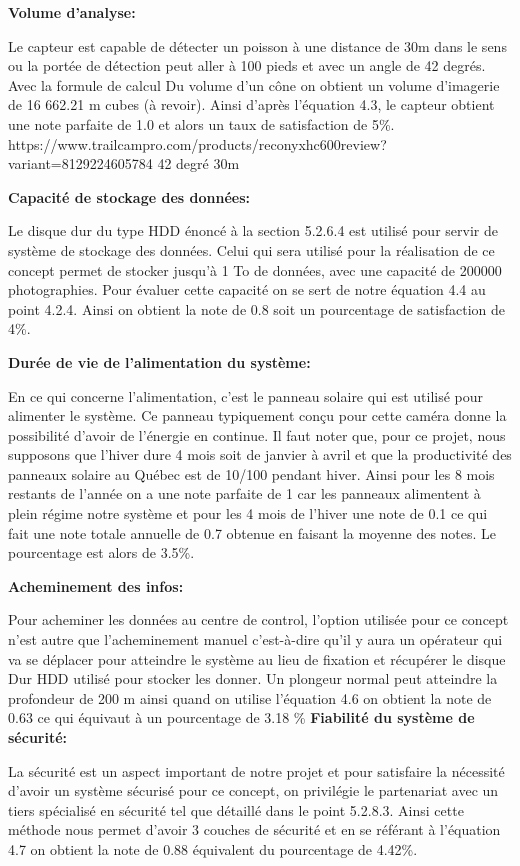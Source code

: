 \textbf{Volume d’analyse:}

Le capteur est capable de détecter un poisson à une distance de 30m dans le sens ou  la portée de détection peut aller à 100 pieds  et avec un angle de 42 degrés. Avec la formule de calcul Du volume d’un cône on obtient un volume d’imagerie de 16 662.21 m cubes (à revoir). Ainsi d’après l’équation 4.3, le capteur obtient une note parfaite de 1.0 et alors un taux de satisfaction de 5\%.
https://www.trailcampro.com/products/reconyxhc600review?variant=8129224605784 42 degré 30m

\textbf{Capacité de stockage des données:}

  Le disque dur du type HDD énoncé à la section 5.2.6.4 est utilisé pour servir de système de stockage des données. Celui qui sera utilisé pour la réalisation de ce concept permet de stocker jusqu’à 1 To de données, avec une capacité de 200000 photographies. Pour évaluer cette capacité on se sert de notre équation 4.4 au point 4.2.4. Ainsi on obtient la note de 0.8 soit un pourcentage de satisfaction de 4\%.
  
\textbf{Durée de vie de l’alimentation du système:}

 En ce qui concerne l’alimentation, c’est le panneau solaire qui est utilisé pour alimenter le système. Ce panneau typiquement conçu pour cette caméra donne la possibilité d’avoir de l’énergie en continue. Il faut noter que, pour ce projet, nous supposons que l’hiver dure 4 mois soit de janvier à avril et que la productivité des panneaux solaire au Québec est de 10/100 pendant hiver. Ainsi pour les 8 mois restants de l’année on a une note parfaite de 1 car les panneaux alimentent à plein régime notre système et pour les 4 mois de l’hiver une note de 0.1  ce qui fait une note totale annuelle de 0.7 obtenue en faisant la moyenne des notes. Le pourcentage est alors de 3.5\%.
 
\textbf{Acheminement des infos:}

Pour acheminer les données au centre de control, l’option utilisée pour ce concept n’est autre que l’acheminement manuel c’est-à-dire qu’il y aura un opérateur qui va se déplacer pour atteindre le système au lieu de fixation et récupérer le disque Dur HDD utilisé pour stocker les donner. Un plongeur normal peut atteindre la profondeur de 200 m ainsi quand on utilise l’équation 4.6 on obtient la note de 0.63 ce qui équivaut à un pourcentage de 3.18 \%
\textbf{Fiabilité du système de sécurité:}

La sécurité est un aspect important de notre projet et pour satisfaire la nécessité d’avoir un système sécurisé pour ce concept, on privilégie le partenariat avec un tiers spécialisé en sécurité tel que détaillé dans le point 5.2.8.3. Ainsi cette méthode nous permet d’avoir 3  couches de sécurité et en se référant à l’équation 4.7 on obtient la note de 0.88 équivalent du pourcentage de 4.42\%.

